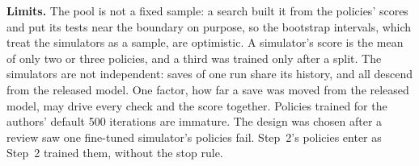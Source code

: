 \textbf{Limits.} The pool is not a fixed sample: a search built it from the policies' scores and put its tests near
the boundary on purpose, so the bootstrap intervals, which treat the simulators as a sample, are optimistic. A
simulator's score is the mean of only two or three policies, and a third was trained only after a split. The
simulators are not independent: saves of one run share its history, and all descend from the released model. One
factor, how far a save was moved from the released model, may drive every check and the score together. Policies
trained for the authors' default 500 iterations are immature. The design was chosen after a review saw one fine-tuned
simulator's policies fail. Step~2's policies enter as Step~2 trained them, without the stop rule.
